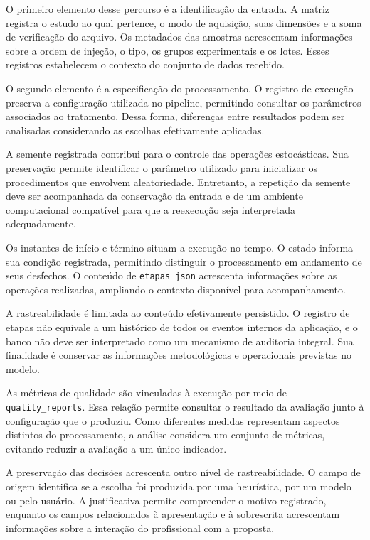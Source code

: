 O primeiro elemento desse percurso é a identificação da entrada. A matriz registra o estudo ao qual pertence, o modo de aquisição, suas dimensões e a soma de verificação do arquivo. Os metadados das amostras acrescentam informações sobre a ordem de injeção, o tipo, os grupos experimentais e os lotes. Esses registros estabelecem o contexto do conjunto de dados recebido.

O segundo elemento é a especificação do processamento. O registro de execução preserva a configuração utilizada no pipeline, permitindo consultar os parâmetros associados ao tratamento. Dessa forma, diferenças entre resultados podem ser analisadas considerando as escolhas efetivamente aplicadas.

A semente registrada contribui para o controle das operações estocásticas. Sua preservação permite identificar o parâmetro utilizado para inicializar os procedimentos que envolvem aleatoriedade. Entretanto, a repetição da semente deve ser acompanhada da conservação da entrada e de um ambiente computacional compatível para que a reexecução seja interpretada adequadamente.

Os instantes de início e término situam a execução no tempo. O estado informa sua condição registrada, permitindo distinguir o processamento em andamento de seus desfechos. O conteúdo de \texttt{etapas\_json} acrescenta informações sobre as operações realizadas, ampliando o contexto disponível para acompanhamento.

A rastreabilidade é limitada ao conteúdo efetivamente persistido. O registro de etapas não equivale a um histórico de todos os eventos internos da aplicação, e o banco não deve ser interpretado como um mecanismo de auditoria integral. Sua finalidade é conservar as informações metodológicas e operacionais previstas no modelo.

As métricas de qualidade são vinculadas à execução por meio de \texttt{quality\_reports}. Essa relação permite consultar o resultado da avaliação junto à configuração que o produziu. Como diferentes medidas representam aspectos distintos do processamento, a análise considera um conjunto de métricas, evitando reduzir a avaliação a um único indicador.

A preservação das decisões acrescenta outro nível de rastreabilidade. O campo de origem identifica se a escolha foi produzida por uma heurística, por um modelo ou pelo usuário. A justificativa permite compreender o motivo registrado, enquanto os campos relacionados à apresentação e à sobrescrita acrescentam informações sobre a interação do profissional com a proposta.

